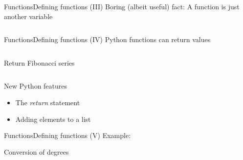\documentclass[10pt,compress]{beamer} %
\begin{document}
\begin{frame}{Functions}{Defining functions (III)}
	Boring (albeit useful) fact: A function is just another variable
    \begin{columns}
		\begin{block}{}
		\vspace{-0.2cm}
		
		\vspace{-0.2cm}
		\end{block}
	\end{columns}
\end{frame}

\begin{frame}{Functions}{Defining functions (IV)}
	Python functions can return values
  \begin{columns}
		\begin{block}{Return Fibonacci series}
		\vspace{-0.2cm}
		
		\vspace{-0.2cm}
		\end{block}
 \end{columns}

	\vspace{0.2cm}
	New Python features
	\begin{itemize}
		\item The \textit{return} statement
		\item Adding elements to a list
	\end{itemize}

\end{frame}

\begin{frame}{Functions}{Defining functions (V)}
Example:
    
		\begin{block}{Conversion of degrees}
		\vspace{-0.2cm}
		
		\vspace{-0.2cm}
		\end{block}

\end{frame}
\end{document}
